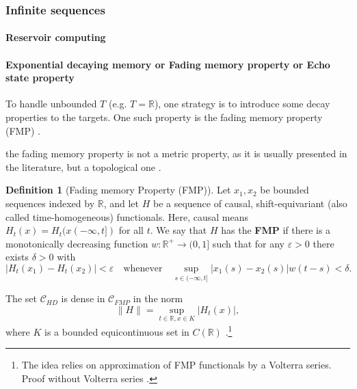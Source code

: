 \documentclass{article}
\theoremstyle{definition}
\newtheorem{definition}{Definition}
\theoremstyle{remark}
\begin{document}
\subsubsection{Infinite sequences}


\paragraph{Reservoir computing}
\citep{grigoryeva2024forecasting}
\citep{pathak2017using}
\citep{li2024simple}


\paragraph{Exponential decaying memory or Fading memory property or Echo state property}

To handle unbounded $T$ (e.g. $T = \mathbb{R}$), one strategy is to introduce some decay properties to the targets.
One such property is the fading memory property (FMP) \citep{boyd1985fading}.





\citep{matthews1993approximating}

the fading memory property is not a metric property, as it is usually presented in the literature, but a topological one \citep{grigoryeva2018universal}. 

\begin{definition}[Fading memory Property (FMP)]
Let $x_1, x_2$ be bounded sequences indexed by $\mathbb{R}$, and let $H$ be a sequence of causal, shift-equivariant (also called time-homogeneous) functionals.
Here, causal means $H_t(x) = H_t(x(-\infty,t])$ for all $t$.
We say that $H$ has the \textbf{FMP} if there is a monotonically decreasing function $w : \mathbb{R}^+ \to (0, 1]$ such that for any $\varepsilon > 0$ there exists $\delta > 0$ with 
\[
|H_t(x_1) - H_t(x_2)| < \varepsilon \quad \text{whenever} \quad \sup_{s \in (-\infty, t]} |x_1(s) - x_2(s)| w(t - s) < \delta.
\]
\end{definition}

The set \( \mathcal{C}_{HD} \) is dense in \(  \mathcal{C}_{FMP} \) in the norm 
\[
\|H\| = \sup_{t \in \mathbb{R}, x \in K} |H_t(x)|,
\]
where \( K \) is a bounded equicontinuous set in \( C(\mathbb{R}) \) \citep{boyd1985fading, grigoryeva2018echo}.\footnote{The idea relies on approximation of FMP functionals by a Volterra series. Proof without Volterra series \citep{grigoryeva2019differentiable}.}
\end{document}
